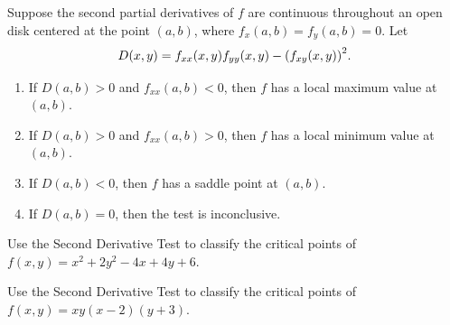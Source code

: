 \documentclass[mathNotesPreamble]{subfiles}
\begin{document}
  \begin{thmBox*}
    Suppose the second partial derivatives of $f$ are continuous throughout an open disk centered at the point $(a,b)$, where $f_x(a,b)=f_y(a,b)=0$. Let 
      \[D(x,y)=f_{xx}(x,y) f_{yy}(x,y)-{\left(f_{xy}(x,y)\right)}^2.\]
    \begin{enumerate}
      \item 
        If $D(a,b) > 0$ and $f_{xx}(a,b) < 0$, then $f$ has a local maximum value at $(a,b)$.
      \item 
        If $D(a,b) > 0$ and $f_{xx}(a,b) > 0$, then $f$ has a local minimum value at $(a,b)$.
      \item 
        If $D(a,b) <0$, then $f$ has a saddle point at $(a,b)$.
      \item 
        If $D(a,b)=0$, then the test is inconclusive.
    \end{enumerate}
  \end{thmBox*}
  \pagebreak

  \begin{ex*}
    Use the Second Derivative Test to classify the critical points of \newline
    $f(x,y)=x^2+2y^2-4x+4y+6$.
  \end{ex*}

  \begin{ex*}
    Use the Second Derivative Test to classify the critical points of \newline
    $f(x,y)=xy(x-2)(y+3)$.
  \end{ex*}
  \pagebreak
\end{document}
